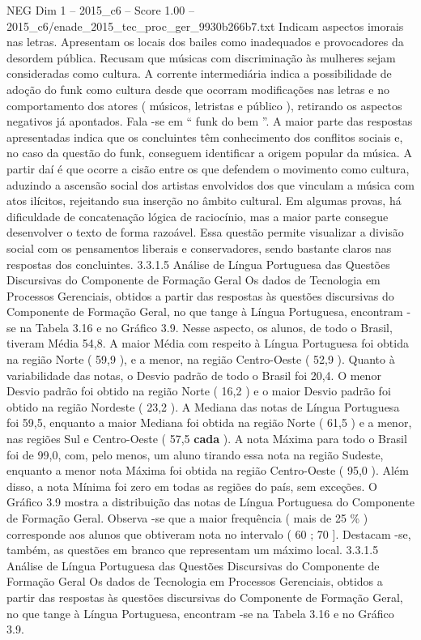 \begin{textsample}{NEG Dim 1 – 2015\_c6 – Score 1.00 – 2015\_c6/enade\_2015\_tec\_proc\_ger\_9930b266b7.txt}
Indicam aspectos imorais nas letras.
Apresentam os locais dos bailes como inadequados e provocadores da desordem pública.
Recusam que músicas com discriminação às mulheres sejam consideradas como cultura.
A corrente intermediária indica a possibilidade de adoção do funk como cultura desde que ocorram modificações nas letras e no comportamento dos atores ( músicos, letristas e público ), retirando os aspectos negativos já apontados.
Fala -se em “ funk do bem ”.
A maior parte das respostas apresentadas indica que os concluintes têm conhecimento dos conflitos sociais e, no caso da questão do funk, conseguem identificar a origem popular da música.
A partir daí é que ocorre a cisão entre os que defendem o movimento como cultura, aduzindo a ascensão social dos artistas envolvidos dos que vinculam a música com atos ilícitos, rejeitando sua inserção no âmbito cultural.
Em algumas provas, há dificuldade de concatenação lógica de raciocínio, mas a maior parte consegue desenvolver o texto de forma razoável.
Essa questão permite visualizar a divisão social com os pensamentos liberais e conservadores, sendo bastante claros nas respostas dos concluintes. 3.3.1.5 Análise de Língua Portuguesa das Questões Discursivas do Componente de Formação Geral Os dados de Tecnologia em Processos Gerenciais, obtidos a partir das respostas às questões discursivas do Componente de Formação Geral, no que tange à Língua Portuguesa, encontram -se na Tabela 3.16 e no Gráfico 3.9.
Nesse aspecto, os alunos, de todo o Brasil, tiveram Média 54,8.
A maior Média com respeito à Língua Portuguesa foi obtida na região Norte ( 59,9 ), e a menor, na região Centro-Oeste ( 52,9 ).
Quanto à variabilidade das notas, o Desvio padrão de todo o Brasil foi 20,4.
O menor Desvio padrão foi obtido na região Norte ( 16,2 ) e o maior Desvio padrão foi obtido na região Nordeste ( 23,2 ).
A Mediana das notas de Língua Portuguesa foi 59,5, enquanto a maior Mediana foi obtida na região Norte ( 61,5 ) e a menor, nas regiões Sul e Centro-Oeste ( 57,5 \textbf{cada} ).
A nota Máxima para todo o Brasil foi de 99,0, com, pelo menos, um aluno tirando essa nota na região Sudeste, enquanto a menor nota Máxima foi obtida na região Centro-Oeste ( 95,0 ).
Além disso, a nota Mínima foi zero em todas as regiões do país, sem exceções.
O Gráfico 3.9 mostra a distribuição das notas de Língua Portuguesa do Componente de Formação Geral.
Observa -se que a maior frequência ( mais de 25 \% ) corresponde aos alunos que obtiveram nota no intervalo ( 60 ; 70 ].
Destacam -se, também, as questões em branco que representam um máximo local. 3.3.1.5 Análise de Língua Portuguesa das Questões Discursivas do Componente de Formação Geral Os dados de Tecnologia em Processos Gerenciais, obtidos a partir das respostas às questões discursivas do Componente de Formação Geral, no que tange à Língua Portuguesa, encontram -se na Tabela 3.16 e no Gráfico 3.9.

\end{textsample}
